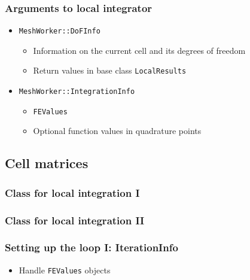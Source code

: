 \begin{frame}
  \frametitle{Arguments to local integrator}
  \begin{itemize}
  \item\texttt{MeshWorker::DoFInfo}
    \begin{itemize}
    \item Information on the current cell and its degrees of freedom
    \item Return values in base class \texttt{LocalResults}
    \end{itemize}
  \item\texttt{MeshWorker::IntegrationInfo}
    \begin{itemize}
    \item \texttt{FEValues}
    \item Optional function values in quadrature points
    \end{itemize}
  \end{itemize}
\end{frame}

\subsection{Cell matrices}
\begin{frame}
  \frametitle{Class for local integration I}
  \begin{block}{}
    
  \end{block}
\end{frame}

\begin{frame}
  \frametitle{Class for local integration II}
  \begin{block}{}
    
  \end{block}
\end{frame}

\begin{frame}
  \frametitle{Setting up the loop I: IterationInfo}
  \begin{itemize}
  \item Handle \texttt{FEValues} objects
  \end{itemize}
  \begin{block}{}
    
  \end{block}
\end{frame}

